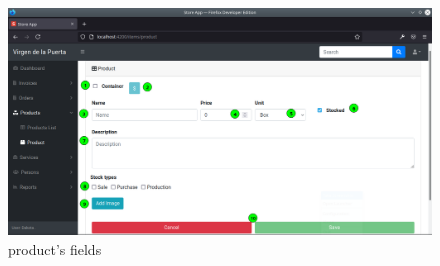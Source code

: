 \documentclass[a4paper,11pt]{refart}
\begin{document}
\begin{enumerate}
\begin{leftbar}
		\end{leftbar}
	\begin{figure}[H]\centering
		\includegraphics[width=\textwidth]{images/product_form-fields.png}
		\caption{product's fields}
		\label{fig:product_form-fields}
	\end{figure}
\end{enumerate}	
\end{document}
